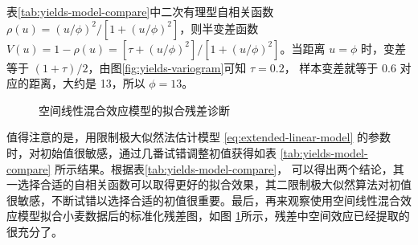 \documentclass[12pt,a4paper,UTF8,twoside]{book}
\theoremstyle{definition}
\theoremstyle{definition}
\theoremstyle{definition}
\theoremstyle{remark}
\begin{document}
表\ref{tab:yields-model-compare}中二次有理型自相关函数
\(\rho(u) = (u/\phi)^2/[1 + (u/\phi)^2]\)，则半变差函数
\(V(u) = 1-\rho(u) = [\tau + (u/\phi)^2]/[1 + (u/\phi)^2]\)。当距离
\(u = \phi\) 时，变差等于
\((1+\tau)/2\)，由图\ref{fig:yields-variogram}可知 \(\tau = 0.2\)，
样本变差就等于 0.6 对应的距离，大约是 13，所以 \(\phi=13\)。

\begin{figure}

{\centering {}

}

\caption{空间线性混合效应模型的拟合残差诊断}\label{fig:model-check}
\end{figure}

值得注意的是，用限制极大似然法估计模型 \eqref{eq:extended-linear-model}
的参数时，对初始值很敏感，通过几番试错调整初值获得如表
\ref{tab:yields-model-compare}
所示结果。根据表\ref{tab:yields-model-compare}，
可以得出两个结论，其一选择合适的自相关函数可以取得更好的拟合效果，其二限制极大似然算法对初值很敏感，不断试错以选择合适的初值很重要。最后，再来观察使用空间线性混合效应模型拟合小麦数据后的标准化残差图，如图
\ref{fig:model-check}所示，残差中空间效应已经提取的很充分了。
\end{document}
